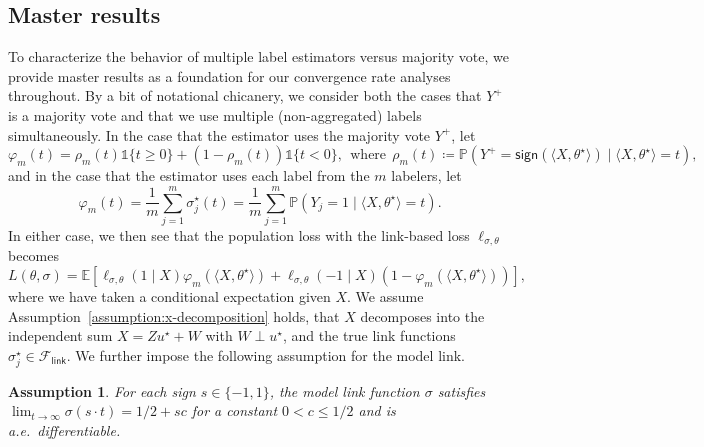 \documentclass[11pt]{article}
\newcommand{\ha}[1]{\textcolor{ha}{[HA: #1]}}
\newcommand{\ind}{\mathds{1}}
\newcommand{\E}{\mathbb{E}}
\renewcommand{\P}{\mathbb{P}}
\newcommand{\what}[1]{\widehat{#1}}
\newcommand{\majY}{Y^+}
\newcommand{\sgn}{\mathsf{sign}}
\newcommand{\lr}{^{\textup{lr}}}
\newcommand{\mv}{^{\textup{mv}}}
\newcommand{\Flink}{\mathcal{F}_{\mathsf{link}}}
\newcommand{\loss}{\ell}
\newcommand{\<}{\langle} %
\renewcommand{\>}{\rangle}
\newcommand{\defeq}{\coloneqq}
\newcommand{\opt}{^\star}
\newcommand{\gme}{\what{\theta}_{n,m}} %
\newcommand{\tmle}{\what{\theta}\lr_{n,m}} %
\newcommand{\mve}{\what{\theta}\mv_{n,m}} %
\newtheorem{assumption}{Assumption}
\begin{document}

\subsection{Master results} \label{sec:master-results}

To characterize the behavior of multiple label estimators versus majority
vote, we provide master results as a foundation
for our convergence rate analyses throughout. By
a bit of notational chicanery, we consider both the cases that $\majY$ is a
majority vote and that we use multiple (non-aggregated) labels
simultaneously. In the case that the estimator uses the majority vote
$\majY$, let
\begin{equation*}
  \varphi_m(t) = \rho_m(t) \ind \{t \geq 0\} + (1 - \rho_m(t)) \ind\{t < 0\},
  ~~ \mbox{where} ~~
  \rho_m(t) \defeq
  \P(\majY = \sgn(\<X, \theta\opt\>) \mid \<X, \theta\opt\> = t),
\end{equation*}
and in the case that the estimator uses each label
from the $m$ labelers, let
\begin{equation*}
	\varphi_m(t) = \frac{1}{m} \sum_{j = 1}^m \sigma_j\opt(t)
	= \frac{1}{m} \sum_{j = 1}^m \P(Y_j = 1 \mid \<X, \theta\opt\> = t).
\end{equation*}
In either case, we then see that the population loss with
the link-based loss $\loss_{\sigma,\theta}$ becomes
\begin{equation}
	\label{eqn:generic-loss}
	L(\theta, \sigma) = \E\left[\loss_{\sigma,\theta}(1 \mid X)
	\varphi_m(\<X, \theta\opt\>)
	+ \loss_{\sigma,\theta}(-1 \mid X)
	(1 - \varphi_m(\<X, \theta\opt\>))\right],
\end{equation}
where we have taken a conditional expectation given $X$. We assume
Assumption~\ref{assumption:x-decomposition} holds, that $X$ decomposes into
the independent sum $X= Zu\opt + W$ with $W \perp u\opt$, and the true link
functions $\sigma_j\opt \in \Flink$. We further impose the following
assumption for the model link.
\begin{assumption}
	\label{assumption:model-link}
	For each sign $s \in \{-1, 1\}$,
	the model link function $\sigma$ satisfies
	$\lim_{t \to \infty} \sigma(s \cdot t) = 1/2 + sc$ for a constant
	$0 < c \le 1/2$ and is a.e.\ differentiable.
\end{assumption}
\end{document}
